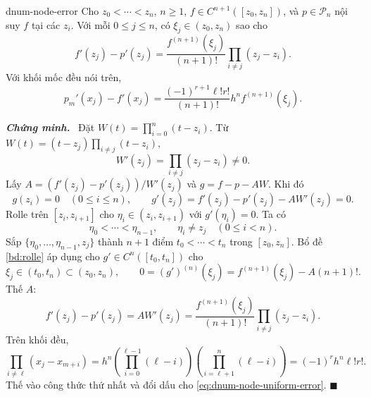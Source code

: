 \documentclass[12pt,a4paper,oneside]{book}
\numberwithin{algorithm}{chapter}
\theoremstyle{definition}
\newenvironment{chungminh}{\par\medskip\noindent\textbf{\textit{\color{mainblue}Chứng minh.}}\ }{\hfill$\blacksquare$\par\medskip}
\begin{document}
\begin{dinhly}{}{dnum-node-error}
Cho $z_0<\cdots<z_n$, $n\geq1$, $f\in C^{n+1}([z_0,z_n])$, và $p\in\mathcal P_n$ nội suy $f$ tại các $z_i$. Với mỗi $0\leq j\leq n$, có $\xi_j\in(z_0,z_n)$ sao cho
\[
 f'(z_j)-p'(z_j)=\frac{f^{(n+1)}(\xi_j)}{(n+1)!}\prod_{i\ne j}(z_j-z_i).
\]
Với khối mốc đều nói trên,
\begin{equation}\label{eq:dnum-node-uniform-error}
 p_m'(x_j)-f'(x_j)
 =\frac{(-1)^{r+1}\ell!r!}{(n+1)!}h^n f^{(n+1)}(\xi_j).
\end{equation}
\end{dinhly}
\begin{chungminh}
Đặt $W(t)=\prod_{i=0}^n(t-z_i)$. Từ $W(t)=(t-z_j)\prod_{i\ne j}(t-z_i)$,
\[
 W'(z_j)=\prod_{i\ne j}(z_j-z_i)\ne0.
\]
Lấy $A=(f'(z_j)-p'(z_j))/W'(z_j)$ và $g=f-p-AW$. Khi đó
\[
 g(z_i)=0\quad(0\leq i\leq n),\qquad g'(z_j)=f'(z_j)-p'(z_j)-AW'(z_j)=0.
\]
Rolle trên $[z_i,z_{i+1}]$ cho $\eta_i\in(z_i,z_{i+1})$ với $g'(\eta_i)=0$. Ta có
\[
 \eta_0<\cdots<\eta_{n-1},\qquad \eta_i\ne z_j\quad(0\leq i<n).
\]
Sắp $\{\eta_0,\ldots,\eta_{n-1},z_j\}$ thành $n+1$ điểm $t_0<\cdots<t_n$ trong $[z_0,z_n]$. Bổ đề \ref{bd:rolle} áp dụng cho $g'\in C^n([t_0,t_n])$ cho
\[
 \xi_j\in(t_0,t_n)\subset(z_0,z_n),\qquad
 0=(g')^{(n)}(\xi_j)=f^{(n+1)}(\xi_j)-A(n+1)!.
\]
Thế $A$:
\[
 f'(z_j)-p'(z_j)=AW'(z_j)
 =\frac{f^{(n+1)}(\xi_j)}{(n+1)!}\prod_{i\ne j}(z_j-z_i).
\]
Trên khối đều,
\[
 \prod_{i\ne\ell}(x_j-x_{m+i})
 =h^n\left(\prod_{i=0}^{\ell-1}(\ell-i)\right)
 \left(\prod_{i=\ell+1}^{n}(\ell-i)\right)
 =(-1)^rh^n\ell!r!.
\]
Thế vào công thức thứ nhất và đổi dấu cho \eqref{eq:dnum-node-uniform-error}.
\end{chungminh}
\end{document}
